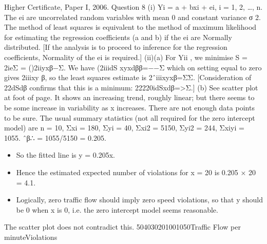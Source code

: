 \documentclass[a4paper,12pt]{article}
\begin{document}
Higher Certificate, Paper I, 2006. Question 8
(i) Yi = a + bxi + ei, i = 1, 2, …, n.
The {ei} are uncorrelated random variables with mean 0 and constant variance σ 2.
The method of least squares is equivalent to the method of maximum likelihood for estimating the regression coefficients (a and b) if the {ei} are Normally distributed.
[If the analysis is to proceed to inference for the regression coefficients, Normality of the {ei} is required.]
(ii)(a) For Yii , we minimise S = 2ieΣ = ()2iiyxβ−Σ.
We have (2iiidS xyxdββ=−−Σ which on setting equal to zero gives 2iiixy β, so the least squares estimate is 2ˆiiixyxβ=ΣΣ.
[Consideration of 22dSdβ confirms that this is a minimum: 22220idSxdβ=>Σ.]
(b) See scatter plot at foot of page. It shows an increasing trend, roughly linear; but there seems to be some increase in variability as x increases. There are not enough data points to be sure.
The usual summary statistics (not all required for the zero intercept model) are
n = 10, Σxi = 180, Σyi = 40, Σxi2 = 5150, Σyi2 = 244, Σxiyi = 1055.
ˆβ∴ =
1055/5150 =
0.205. 

\begin{itemize}
\item So the fitted line is y
= 0.205x.
\item Hence the estimated expected number of violations for x = 20 is 0.205 × 20 = 4.1.
\item Logically, zero traffic flow should imply zero speed violations, so that y should be 0 when x is 0, i.e. the zero intercept model seems reasonable.
\end{itemize} The scatter plot does not contradict this.
504030201001050Traffic Flow per minuteViolations
\end{document}
